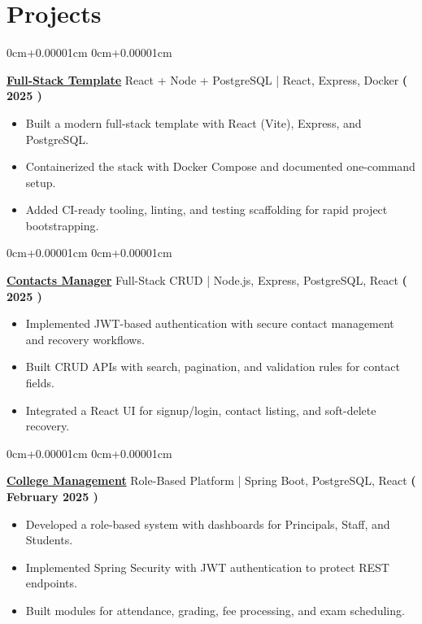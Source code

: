 \documentclass[10pt,a4paper]{article}
\newenvironment{highlights}{
    \begin{itemize}[
        topsep=0.10cm,
        parsep=0.10cm,
        partopsep=0pt,
        itemsep=0pt,
        leftmargin=10pt,
    ]
    }{
    \end{itemize}
}
\newenvironment{onecolentry}{
    \begin{adjustwidth}{
        0cm+0.00001cm
    }{
        0cm+0.00001cm
    }
    }{
    \end{adjustwidth}
}
\begin{document}
    \section{Projects}\label{sec:projects}
    \begin{onecolentry}
        \textbf{\href{https://github.com/Jefino9488/template-vite-react-node-postgres}{Full-Stack Template}} React + Node + PostgreSQL | React, Express, Docker \hfill \textbf{( 2025 )} \\
        \begin{highlights}
            \item Built a modern full-stack template with React (Vite), Express, and PostgreSQL.
            \item Containerized the stack with Docker Compose and documented one-command setup.
            \item Added CI-ready tooling, linting, and testing scaffolding for rapid project bootstrapping.
        \end{highlights}
    \end{onecolentry}
    \vspace{0.1cm}
    \begin{onecolentry}
        \textbf{\href{https://github.com/Jefino9488/Contacts-Manager}{Contacts Manager}} Full-Stack CRUD | Node.js, Express, PostgreSQL, React \hfill \textbf{( 2025 )} \\
        \begin{highlights}
            \item Implemented JWT-based authentication with secure contact management and recovery workflows.
            \item Built CRUD APIs with search, pagination, and validation rules for contact fields.
            \item Integrated a React UI for signup/login, contact listing, and soft-delete recovery.
        \end{highlights}
    \end{onecolentry}
    \vspace{0.1cm}
    \begin{onecolentry}
        \textbf{\href{https://github.com/jefino9488/college-management-server}{College Management}} Role-Based Platform | Spring Boot, PostgreSQL, React \hfill \textbf{( February 2025 )} \\
        \begin{highlights}
            \item Developed a role-based system with dashboards for Principals, Staff, and Students.
            \item Implemented Spring Security with JWT authentication to protect REST endpoints.
            \item Built modules for attendance, grading, fee processing, and exam scheduling.
        \end{highlights}
    \end{onecolentry}
\end{document}
